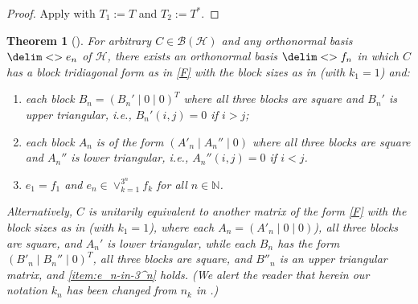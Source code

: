 \documentclass[10pt,reqno]{amsart}
\newtheorem{theorem}{Theorem}[section]
\theoremstyle{remark}
\newcommand{\BH}{\mathcal{B}(\Hil)}
\newcommand{\Hil}{\mathcal{H}}
\newcommand{\seq}{\delim<>}
\numberwithin{equation}{section}
\begin{document}
\begin{proof}
  Apply  with $T_1 := T$ and $T_2 := T^{*}$.
\end{proof}

\begin{theorem}[]
  \label{t3aa}
  For arbitrary $C\in\BH$ and any orthonormal basis $\seq{e_n}$ of $\Hil$, there exists an orthonormal basis $\seq{f_n}$  in which $C$ has a block tridiagonal form as in \eqref{F} with the block sizes as in  (with $k_1=1$) and:
  \begin{enumerate}
  \item each block $B_n=(B_n' \mid 0\mid 0)^T$ where all three blocks are square and $B_n'$ is upper triangular, i.e., $B_n'(i,j)=0$ if $i>j$;
  \item each block $A_n$ is of the form $(A'_n \mid A_n'' \mid 0)$ where all three blocks are square and
    $A_n''$ is lower triangular, i.e., $A_n''(i,j)=0$ if $i<j$.
  \item \label{item:e_n-in-3^n} $e_1=f_1$ and $e_n\in \vee_{k=1}^{3^n} f_k$ for all $n\in\mathbb{N}$.
  \end{enumerate}
  Alternatively, $C$ is unitarily equivalent to another matrix of the form \eqref{F} with the block sizes as in  (with $k_1=1$), where each $A_n = (A'_n \mid 0\mid 0)$), all three blocks are square, and $A_n'$ is lower triangular, while each $B_n$ has the form $(B'_n \mid B_n''\mid 0)^T$, all three blocks are square, and $B''_n$ is an upper triangular matrix, and \ref{item:e_n-in-3^n} holds.
  (We alert the reader that herein our notation $k_n$ has been changed from $n_k$ in \cite{PPW-2020-TmloVLOt}.)
\end{theorem}
\end{document}
